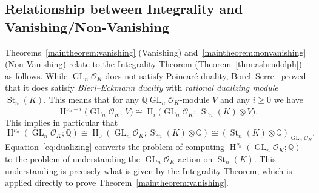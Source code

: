 \documentclass[11 pt]{article}
\theoremstyle{plain}
\theoremstyle{definition}
\numberwithin{equation}{section}
\DeclareMathOperator{\GL}{GL}
\DeclareMathOperator{\SL}{SL}
\newcommand\Q{\ensuremath{\mathbb{Q}}}
\DeclareMathOperator{\HH}{H}
\newcommand{\paranoskip}[1]{\noindent\textbf{#1.}}
\renewcommand{\O}{\mathcal{O}}
\DeclareMathOperator{\class}{cl}
\DeclareMathOperator{\St}{St}
\newcommand\abs[1]{\left\lvert#1\right\rvert}
\newcommand\iso{\cong}
\newcommand\GLvcd{\nu_n}
\begin{document}
\subsection{Relationship between Integrality and Vanishing/Non-Vanishing}

Theorems~\ref{maintheorem:vanishing} (Vanishing) and~\ref{maintheorem:nonvanishing} (Non-Vanishing) relate to the Integrality Theorem (Theorem~\ref{thm:ashrudolph}) as follows.  While $\GL_n \O_K$ does not satisfy Poincar\'{e} duality, Borel--Serre~\cite{BorelSerreCorners} proved that it does satisfy \emph{Bieri--Eckmann duality} with \emph{rational dualizing module} $\St_n(K)$.  This means that for any 
$\Q\GL_n \O_K$-module $V$ and any $i\geq 0$ we have
 \[\HH^{\GLvcd-i}\big(\GL_n \O_K;\,V\big) \iso \HH_i\big(\GL_n \O_K;\, \St_n(K)\otimes V\big).\]
This implies in particular that 
\begin{equation}
\label{eq:dualizing}
\HH^{\GLvcd}(\GL_n \O_K;\Q) \iso \HH_0(\GL_n \O_K;\St_n(K)\otimes \Q) \iso (\St_n(K)\otimes\Q)_{\GL_n \O_K}.
\end{equation}
Equation~\eqref{eq:dualizing} converts the problem of computing $\HH^{\GLvcd}(\GL_n \O_K;\Q)$ to the problem of understanding the $\GL_n \O_K$-action on $\St_n(K)$. This understanding is precisely what is given by the Integrality Theorem, which
is applied directly to prove Theorem~\ref{maintheorem:vanishing}.


\end{document}
